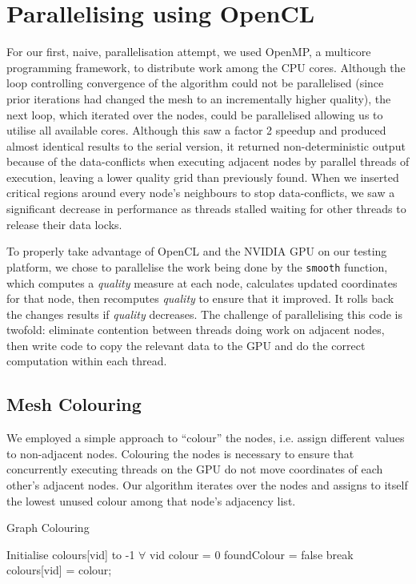\documentclass[a4paper,11pt, twocolumn]{article}
\begin{document}
\section{Parallelising using OpenCL}
For our first, naive, parallelisation attempt, we used OpenMP, a multicore programming framework, to distribute work among the CPU cores.
Although the loop controlling convergence of the algorithm could not be parallelised (since prior iterations had changed the mesh to an incrementally higher quality), the next loop, which iterated over the nodes, could be parallelised allowing us to utilise all available cores.
Although this saw a factor 2 speedup and produced almost identical results to the serial version, it returned non-deterministic output because of the data-conflicts when executing adjacent nodes by parallel threads of execution, leaving a lower quality grid than previously found.
When we inserted critical regions around every node's neighbours to stop data-conflicts, we saw a significant decrease in performance as threads stalled waiting for other threads to release their data locks.

To properly take advantage of OpenCL and the NVIDIA GPU on our testing platform, we chose to parallelise the work being done by the \verb+smooth+ function, which computes a \emph{quality} measure at each node, calculates updated coordinates for that node, then recomputes \emph{quality} to ensure that it improved.
It rolls back the changes results if \emph{quality} decreases.
The challenge of parallelising this code is twofold: eliminate contention between threads doing work on adjacent nodes, then write code to copy the relevant data to the GPU and do the correct computation within each thread.

\subsection{Mesh Colouring}
We employed a simple approach to ``colour'' the nodes, i.e. assign different values to non-adjacent nodes.
Colouring the nodes is necessary to ensure that concurrently executing threads on the GPU do not move coordinates of each other's adjacent nodes.
Our algorithm iterates over the nodes and assigns to itself the lowest unused colour among that node's adjacency list.
\begin{algorithm}[H]
\caption{Graph Colouring}
\label{al:colour}
\begin{algorithmic}[1]
\STATE Initialise colours[vid] to -1 $\forall$ vid
  \STATE colour = 0
      \STATE foundColour = false
      \STATE break
    \ENDIF
  \ENDFOR
  \STATE colours[vid] = colour;
\ENDFOR
\end{algorithmic}
\end{algorithm}
\end{document}
